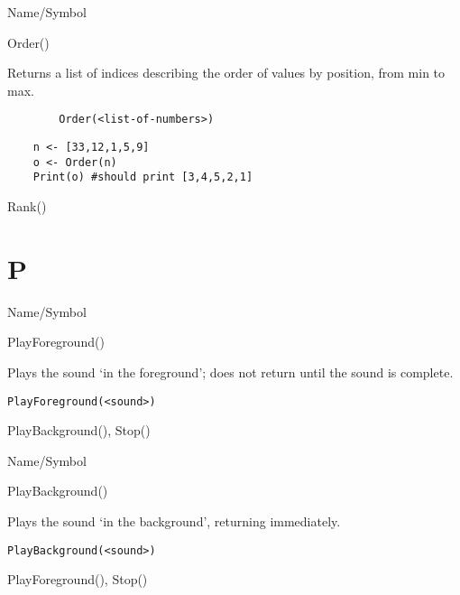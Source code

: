 \rl






\begin{desc}{Name/Symbol}
\item[Name/Symbol]	Order()

\item[Description]	Returns a list of indices describing the order of values by position, from min to max. 

\item[Usage]
\begin{verbatim}
		Order(<list-of-numbers>)
\end{verbatim}

\item[Example]	
\begin{verbatim}
	n <- [33,12,1,5,9]
  	o <- Order(n)
    Print(o) #should print [3,4,5,2,1]
\end{verbatim}

\item[See Also]	Rank()
\end{desc}

\rl
\section{P}
\rl


\begin{desc}{Name/Symbol}
\item[Name/Symbol]	PlayForeground()  

\item[Description]	Plays the sound `in the foreground'; 
		does not return until the sound is complete.

\item[Usage]		
\begin{verbatim}
PlayForeground(<sound>)
\end{verbatim}

\item[Example]	

\item[See Also]	PlayBackground(), Stop()
\end{desc}

\rl


\begin{desc}{Name/Symbol}
\item[Name/Symbol]	PlayBackground()
 
\item[Description]	Plays the sound `in the background', returning immediately.

\item[Usage]		
\begin{verbatim}
PlayBackground(<sound>)
\end{verbatim}

\item[Example]	

\item[See Also]	PlayForeground(), Stop()
\end{desc}

